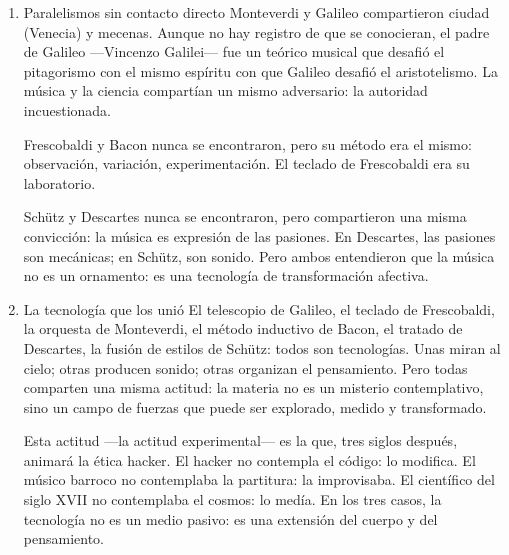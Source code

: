 \documentclass[14pt, a4paper]{article}
\begin{document}
\begin{enumerate}
Heinrich Schütz (1585-1672) viajó a Venecia y absorbió el estilo de
Monteverdi. Lo llevó a Alemania, donde lo fusionó con la tradición
luterana del coral. Schütz es el eslabón que conecta el Renacimiento
italiano con el Barroco alemán. Sin Schütz, no hay Bach.
\item Paralelismos sin contacto directo
\label{paralelismos-siglo-xvii}
Monteverdi y Galileo compartieron ciudad (Venecia) y mecenas. Aunque
no hay registro de que se conocieran, el padre de Galileo —Vincenzo
Galilei— fue un teórico musical que desafió el pitagorismo con el
mismo espíritu con que Galileo desafió el aristotelismo. La música y
la ciencia compartían un mismo adversario: la autoridad incuestionada.

Frescobaldi y Bacon nunca se encontraron, pero su método era el mismo:
observación, variación, experimentación. El teclado de Frescobaldi era
su laboratorio.

Schütz y Descartes nunca se encontraron, pero compartieron una misma
convicción: la música es expresión de las pasiones. En Descartes, las
pasiones son mecánicas; en Schütz, son sonido. Pero ambos entendieron
que la música no es un ornamento: es una tecnología de transformación
afectiva.
\item La tecnología que los unió
\label{tecnologia-siglo-xvii}
El telescopio de Galileo, el teclado de Frescobaldi, la orquesta de
Monteverdi, el método inductivo de Bacon, el tratado de Descartes, la
fusión de estilos de Schütz: todos son tecnologías. Unas miran al
cielo; otras producen sonido; otras organizan el pensamiento. Pero
todas comparten una misma actitud: la materia no es un misterio
contemplativo, sino un campo de fuerzas que puede ser explorado,
medido y transformado.

Esta actitud —la actitud experimental— es la que, tres siglos después,
animará la ética hacker. El hacker no contempla el código: lo modifica.
El músico barroco no contemplaba la partitura: la improvisaba. El
científico del siglo XVII no contemplaba el cosmos: lo medía. En los
tres casos, la tecnología no es un medio pasivo: es una extensión del
cuerpo y del pensamiento.
\end{enumerate}
\end{document}

